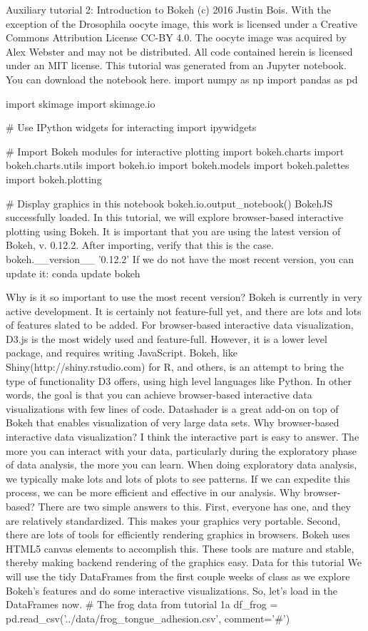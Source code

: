 Auxiliary tutorial 2: Introduction to Bokeh
(c) 2016 Justin Bois. With the exception of the Drosophila oocyte image, this work is licensed under a Creative Commons Attribution License CC-BY 4.0. The oocyte image was acquired by Alex Webster and may not be distributed. All code contained herein is licensed under an MIT license.
This tutorial was generated from an Jupyter notebook. You can download the notebook here.
import numpy as np
import pandas as pd

import skimage
import skimage.io

# Use IPython widgets for interacting
import ipywidgets

# Import Bokeh modules for interactive plotting
import bokeh.charts
import bokeh.charts.utils
import bokeh.io
import bokeh.models
import bokeh.palettes
import bokeh.plotting

# Display graphics in this notebook
bokeh.io.output_notebook()
 BokehJS successfully loaded.
In this tutorial, we will explore browser-based interactive plotting using Bokeh. It is important that you are using the latest version of Bokeh, v. 0.12.2. After importing, verify that this is the case.
bokeh.__version__
'0.12.2'
If we do not have the most recent version, you can update it:
conda update bokeh


Why is it so important to use the most recent version? Bokeh is currently in very active development. It is certainly not feature-full yet, and there are lots and lots of features slated to be added.
For browser-based interactive data visualization, D3.js is the most widely used and feature-full. However, it is a lower level package, and requires writing JavaScript. Bokeh, like Shiny(http://shiny.rstudio.com) for R, and others, is an attempt to bring the type of functionality D3 offers, using high level languages like Python. In other words, the goal is that you can achieve browser-based interactive data visualizations with few lines of code.
Datashader is a great add-on on top of Bokeh that enables visualization of very large data sets.
Why browser-based interactive data visualization?
I think the interactive part is easy to answer. The more you can interact with your data, particularly during the exploratory phase of data analysis, the more you can learn. When doing exploratory data analysis, we typically make lots and lots of plots to see patterns. If we can expedite this process, we can be more efficient and effective in our analysis.
Why browser-based? There are two simple answers to this. First, everyone has one, and they are relatively standardized. This makes your graphics very portable. Second, there are lots of tools for efficiently rendering graphics in browsers. Bokeh uses HTML5 canvas elements to accomplish this. These tools are mature and stable, thereby making backend rendering of the graphics easy.
Data for this tutorial
We will use the tidy DataFrames from the first couple weeks of class as we explore Bokeh's features and do some interactive visualizations. So, let's load in the DataFrames now.
# The frog data from tutorial 1a
df_frog = pd.read_csv('../data/frog_tongue_adhesion.csv', comment='#')

